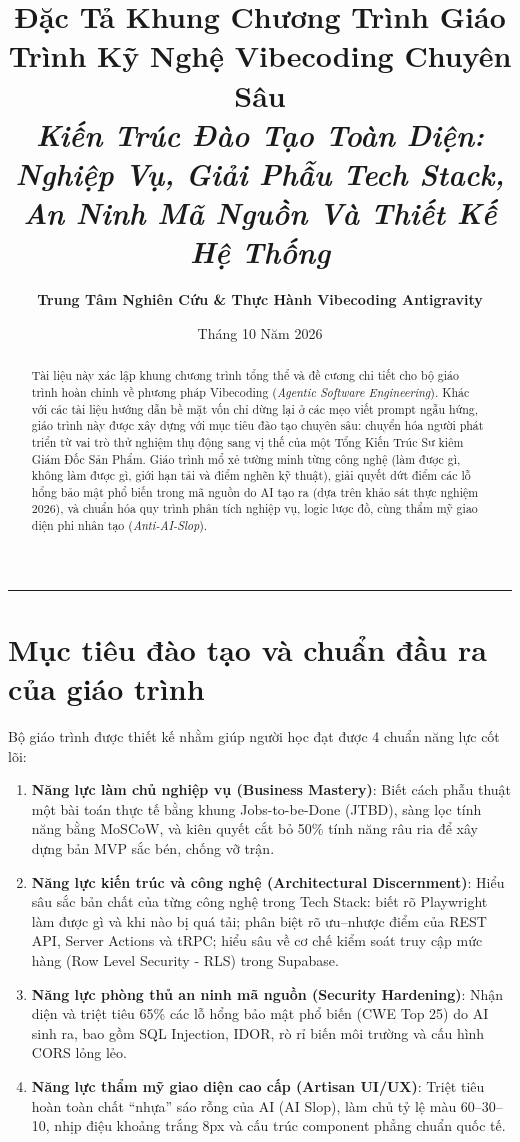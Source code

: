 \documentclass[a4paper,11pt]{article}
\title{\textbf{Đặc Tả Khung Chương Trình Giáo Trình Kỹ Nghệ Vibecoding Chuyên Sâu}\\[0.3em]
\large\textit{Kiến Trúc Đào Tạo Toàn Diện: Nghiệp Vụ, Giải Phẫu Tech Stack, An Ninh Mã Nguồn Và Thiết Kế Hệ Thống}}
\author{\textbf{Trung Tâm Nghiên Cứu \& Thực Hành Vibecoding Antigravity}}
\date{Tháng 10 Năm 2026}
\begin{document}
\maketitle

\begin{abstract}
Tài liệu này xác lập khung chương trình tổng thể và đề cương chi tiết cho bộ giáo trình hoàn chỉnh về phương pháp Vibecoding (\textit{Agentic Software Engineering}). Khác với các tài liệu hướng dẫn bề mặt vốn chỉ dừng lại ở các mẹo viết prompt ngẫu hứng, giáo trình này được xây dựng với mục tiêu đào tạo chuyên sâu: chuyển hóa người phát triển từ vai trò thử nghiệm thụ động sang vị thế của một Tổng Kiến Trúc Sư kiêm Giám Đốc Sản Phẩm. Giáo trình mổ xẻ tường minh từng công nghệ (làm được gì, không làm được gì, giới hạn tải và điểm nghẽn kỹ thuật), giải quyết dứt điểm các lỗ hổng bảo mật phổ biến trong mã nguồn do AI tạo ra (dựa trên khảo sát thực nghiệm 2026), và chuẩn hóa quy trình phân tích nghiệp vụ, logic lược đồ, cùng thẩm mỹ giao diện phi nhân tạo (\textit{Anti-AI-Slop}).
\end{abstract}

\vspace{1em}
\rule{\textwidth}{0.4pt}

\section{Mục tiêu đào tạo và chuẩn đầu ra của giáo trình}

Bộ giáo trình được thiết kế nhằm giúp người học đạt được 4 chuẩn năng lực cốt lõi:
\begin{enumerate}[label={\arabic*.}]
    \item \textbf{Năng lực làm chủ nghiệp vụ (Business Mastery)}: Biết cách phẫu thuật một bài toán thực tế bằng khung Jobs-to-be-Done (JTBD), sàng lọc tính năng bằng MoSCoW, và kiên quyết cắt bỏ 50\% tính năng râu ria để xây dựng bản MVP sắc bén, chống vỡ trận.
    \item \textbf{Năng lực kiến trúc và công nghệ (Architectural Discernment)}: Hiểu sâu sắc bản chất của từng công nghệ trong Tech Stack: biết rõ Playwright làm được gì và khi nào bị quá tải; phân biệt rõ ưu--nhược điểm của REST API, Server Actions và tRPC; hiểu sâu về cơ chế kiểm soát truy cập mức hàng (Row Level Security - RLS) trong Supabase.
    \item \textbf{Năng lực phòng thủ an ninh mã nguồn (Security Hardening)}: Nhận diện và triệt tiêu 65\% các lỗ hổng bảo mật phổ biến (CWE Top 25) do AI sinh ra, bao gồm SQL Injection, IDOR, rò rỉ biến môi trường và cấu hình CORS lỏng lẻo.
    \item \textbf{Năng lực thẩm mỹ giao diện cao cấp (Artisan UI/UX)}: Triệt tiêu hoàn toàn chất ``nhựa'' sáo rỗng của AI (AI Slop), làm chủ tỷ lệ màu 60--30--10, nhịp điệu khoảng trắng 8px và cấu trúc component phẳng chuẩn quốc tế.
\end{enumerate}
\end{document}
